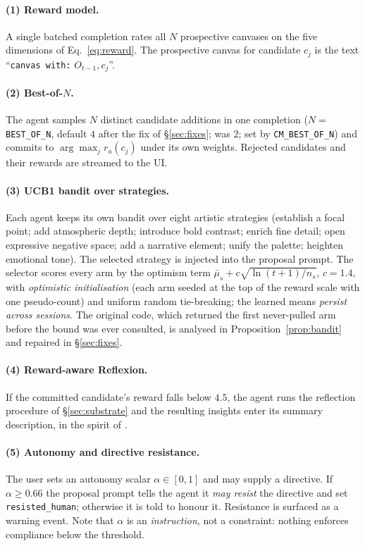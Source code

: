 \documentclass[11pt]{article}
\newcommand{\code}[1]{\texttt{\small #1}}
\theoremstyle{plain}
\theoremstyle{definition}
\begin{document}
\paragraph{(1) Reward model.}
A single batched completion rates all $N$ prospective canvases on the five
dimensions of Eq.~\ref{eq:reward}. The prospective canvas for candidate $c_j$ is
the text ``\code{canvas with:} $O_{t-1}, c_j$''.

\paragraph{(2) Best-of-$N$.}
The agent samples $N$ distinct candidate additions in one completion
($N =$ \code{BEST\_OF\_N}, default $4$ after the fix of \S\ref{sec:fixes}; was
$2$; set by \code{CM\_BEST\_OF\_N}) and commits to $\arg\max_j r_a(c_j)$ under
its own weights. Rejected candidates and their rewards are streamed to the UI.

\paragraph{(3) UCB1 bandit over strategies.}
Each agent keeps its own bandit over eight artistic strategies (establish a
focal point; add atmospheric depth; introduce bold contrast; enrich fine detail;
open expressive negative space; add a narrative element; unify the palette;
heighten emotional tone). The selected strategy is injected into the proposal
prompt. The selector scores every arm by the optimism term
$\bar{\mu}_s + c\sqrt{\ln(t{+}1)/n_s}$, $c = 1.4$, with \emph{optimistic
initialisation} (each arm seeded at the top of the reward scale with one
pseudo-count) and uniform random tie-breaking; the learned means \emph{persist
across sessions}. The original code, which returned the first never-pulled arm
before the bound was ever consulted, is analysed in Proposition~\ref{prop:bandit}
and repaired in \S\ref{sec:fixes}.

\paragraph{(4) Reward-aware Reflexion.}
If the committed candidate's reward falls below $4.5$, the agent runs the
reflection procedure of \S\ref{sec:substrate} and the resulting insights enter
its summary description, in the spirit of \citet{shinn2023reflexion}.

\paragraph{(5) Autonomy and directive resistance.}
The user sets an autonomy scalar $\alpha \in [0,1]$ and may supply a directive.
If $\alpha \ge 0.66$ the proposal prompt tells the agent it \emph{may resist} the
directive and set \code{resisted\_human}; otherwise it is told to honour it.
Resistance is surfaced as a warning event. Note that $\alpha$ is an
\emph{instruction}, not a constraint: nothing enforces compliance below the
threshold.
\end{document}
